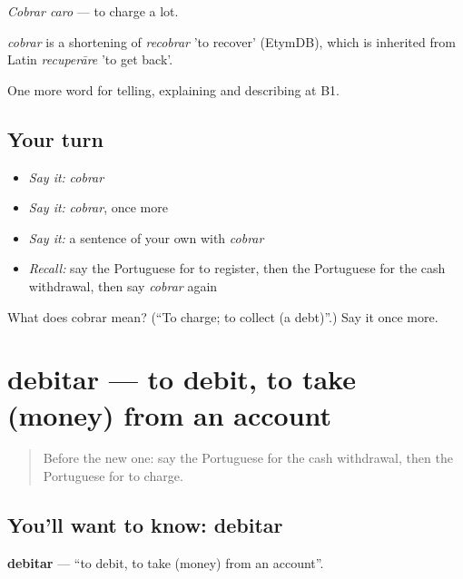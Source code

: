 \emph{Cobrar caro} — to charge a lot.

\begin{cousinweb}
\emph{cobrar} is a shortening of \emph{recobrar} 'to recover' (EtymDB), which is inherited from Latin \emph{recuperāre} 'to get back'.
\end{cousinweb}

\begin{grammarlens}[title={What you've built}]
One more word for telling, explaining and describing at B1.
\end{grammarlens}

\subsection*{Your turn}
\begin{itemize}
\raggedright
  \item \emph{Say it:} \emph{cobrar}
  \item \emph{Say it:} \emph{cobrar}, once more
  \item \emph{Say it:} a sentence of your own with \emph{cobrar}
  \item \emph{Recall:} say the Portuguese for to register, then the Portuguese for the cash withdrawal, then say \emph{cobrar} again
\end{itemize}

\begin{tcolorbox}[breakable,colback=teal!4,colframe=teal!35!black,title={Before you move on}]
What does cobrar mean? (\textquotedblleft{}To charge; to collect (a debt)\textquotedblright{}.) Say it once more.
\end{tcolorbox}
\section[debitar]{debitar — to debit, to take (money) from an account}

\label{lesson:PT-C455-debitar}



\begin{quote}
Before the new one: say the Portuguese for the cash withdrawal, then the Portuguese for to charge.
\end{quote}

\subsection*{You'll want to know: debitar}
\textbf{debitar} — \textquotedblleft{}to debit, to take (money) from an account\textquotedblright{}.

